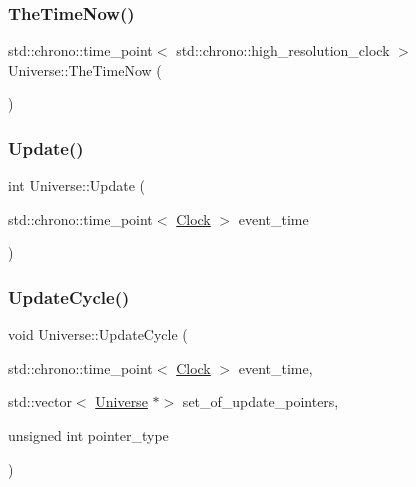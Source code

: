 \mbox{\label{classUniverse_ae54d34c5d695917e074b8e07e8820bdb}} 
\subsubsection{\texorpdfstring{The\+Time\+Now()}{TheTimeNow()}}
{\footnotesize\ttfamily std\+::chrono\+::time\+\_\+point$<$ std\+::chrono\+::high\+\_\+resolution\+\_\+clock $>$ Universe\+::\+The\+Time\+Now (\begin{DoxyParamCaption}{ }\end{DoxyParamCaption})}

\mbox{\label{classUniverse_a64ee5a2c7e86c56fa426acb750438ce9}} 
\subsubsection{\texorpdfstring{Update()}{Update()}}
{\footnotesize\ttfamily int Universe\+::\+Update (\begin{DoxyParamCaption}\item[{std\+::chrono\+::time\+\_\+point$<$ \mbox{\hyperlink{universe_8h_a0ef8d951d1ca5ab3cfaf7ab4c7a6fd80}{Clock}} $>$}]{event\+\_\+time }\end{DoxyParamCaption})}

\mbox{\label{classUniverse_a0d79e614e1af951c06b78cb5768f9c8e}} 
\subsubsection{\texorpdfstring{Update\+Cycle()}{UpdateCycle()}}
{\footnotesize\ttfamily void Universe\+::\+Update\+Cycle (\begin{DoxyParamCaption}\item[{std\+::chrono\+::time\+\_\+point$<$ \mbox{\hyperlink{universe_8h_a0ef8d951d1ca5ab3cfaf7ab4c7a6fd80}{Clock}} $>$}]{event\+\_\+time,  }\item[{std\+::vector$<$ \mbox{\hyperlink{classUniverse}{Universe}} $\ast$$>$}]{set\+\_\+of\+\_\+update\+\_\+pointers,  }\item[{unsigned int}]{pointer\+\_\+type }\end{DoxyParamCaption})}

